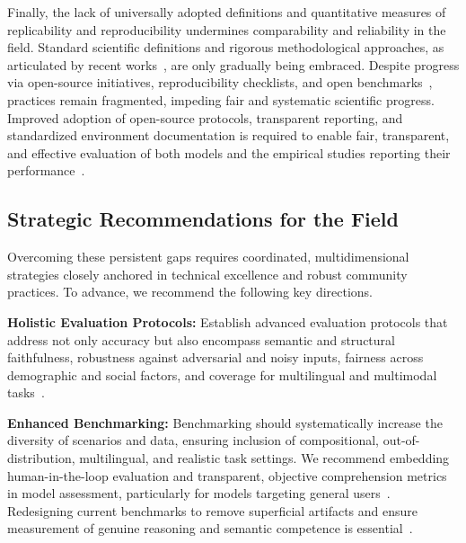 \documentclass[sigconf]{acmart}
\begin{document}
Finally, the lack of universally adopted definitions and quantitative measures of replicability and reproducibility undermines comparability and reliability in the field. Standard scientific definitions and rigorous methodological approaches, as articulated by recent works~\cite{ref13,ref16,ref17,ref22,ref23,ref24,ref33,ref34,ref45,ref53,ref55,ref58,ref59,ref61,ref66,ref67,ref107,ref108}, are only gradually being embraced. Despite progress via open-source initiatives, reproducibility checklists, and open benchmarks~\cite{ref33,ref104,ref106}, practices remain fragmented, impeding fair and systematic scientific progress. Improved adoption of open-source protocols, transparent reporting, and standardized environment documentation is required to enable fair, transparent, and effective evaluation of both models and the empirical studies reporting their performance~\cite{ref13,ref34,ref61,ref106,ref107,ref108}.

\subsection{Strategic Recommendations for the Field}

Overcoming these persistent gaps requires coordinated, multidimensional strategies closely anchored in technical excellence and robust community practices. To advance, we recommend the following key directions.

\textbf{Holistic Evaluation Protocols:}
Establish advanced evaluation protocols that address not only accuracy but also encompass semantic and structural faithfulness, robustness against adversarial and noisy inputs, fairness across demographic and social factors, and coverage for multilingual and multimodal tasks~\cite{ref5,ref9,ref10,ref12,ref15,ref18,ref19,ref21,ref22,ref23,ref34,ref36,ref37,ref38,ref43,ref45,ref46,ref48,ref49,ref50,ref55,ref61,ref62,ref63,ref64,ref65,ref66,ref67,ref68,ref69,ref70,ref71,ref72,ref73,ref74,ref75,ref76,ref77,ref78,ref79,ref80,ref81,ref82,ref83,ref84,ref85,ref86,ref87,ref88,ref89,ref90,ref91,ref92,ref93,ref94,ref95,ref101,ref102,ref104,ref105,ref106,ref107,ref108}.

\textbf{Enhanced Benchmarking:}
Benchmarking should systematically increase the diversity of scenarios and data, ensuring inclusion of compositional, out-of-distribution, multilingual, and realistic task settings. We recommend embedding human-in-the-loop evaluation and transparent, objective comprehension metrics in model assessment, particularly for models targeting general users~\cite{ref10,ref17,ref34,ref37,ref44,ref70,ref77,ref78,ref79,ref80,ref81,ref82,ref83,ref84,ref85,ref94,ref104,ref105}. Redesigning current benchmarks to remove superficial artifacts and ensure measurement of genuine reasoning and semantic competence is essential~\cite{ref44,ref77,ref78,ref98,ref99,ref102}.
\end{document}
